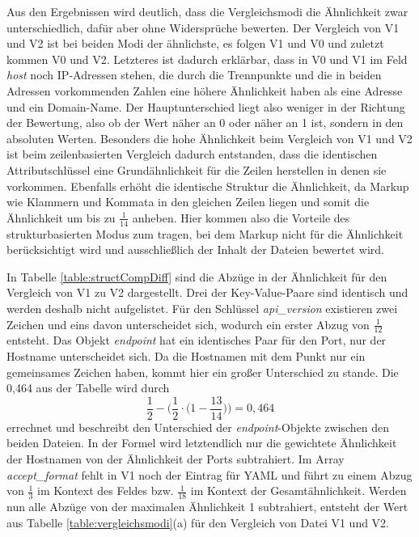 Aus den Ergebnissen wird deutlich, dass die Vergleichsmodi die Ähnlichkeit zwar unterschiedlich, dafür aber ohne Widersprüche bewerten. Der Vergleich von V1 und V2 ist bei beiden Modi der ähnlichste, es folgen V1 und V0 und zuletzt kommen V0 und V2. Letzteres ist dadurch erklärbar, dass in V0 und V1 im Feld \emph{host} noch IP-Adressen stehen, die durch die Trennpunkte und die in beiden Adressen vorkommenden Zahlen eine höhere Ähnlichkeit haben als eine Adresse und ein Domain-Name.
Der Hauptunterschied liegt also weniger in der Richtung der Bewertung, also ob der Wert näher an 0 oder näher an 1 ist, sondern in den absoluten Werten. Besonders die hohe Ähnlichkeit beim Vergleich von V1 und V2 ist beim zeilenbasierten Vergleich dadurch entstanden, dass die identischen Attributschlüssel eine Grundähnlichkeit für die Zeilen herstellen in denen sie vorkommen. Ebenfalls erhöht die identische Struktur die Ähnlichkeit, da Markup wie Klammern und Kommata in den gleichen Zeilen liegen und somit die Ähnlichkeit um bis zu $\frac{1}{14}$ anheben. Hier kommen also die Vorteile des strukturbasierten Modus zum tragen, bei dem Markup nicht für die Ähnlichkeit berücksichtigt wird und ausschließlich der Inhalt der Dateien bewertet wird. 

In Tabelle \ref{table:structCompDiff} sind die Abzüge in der Ähnlichkeit für den Vergleich von V1 zu V2 dargestellt. Drei der Key-Value-Paare sind identisch und werden deshalb nicht aufgelistet. Für den Schlüssel \emph{api\_version} existieren zwei Zeichen und eins davon unterscheidet sich, wodurch ein erster Abzug von $\frac{1}{12}$ entsteht. Das Objekt \emph{endpoint} hat ein identisches Paar für den Port, nur der Hostname unterscheidet sich. Da die Hostnamen mit dem Punkt nur ein gemeinsames Zeichen haben, kommt hier ein großer Unterschied zu stande. Die 0,464 aus der Tabelle wird durch \[ \frac{1}{2} - \Big(\frac{1}{2} \cdot \big(1 -  \frac{13}{14}\big) \Big) = 0,464 \] errechnet und beschreibt den Unterschied der \emph{endpoint}-Objekte zwischen den beiden Dateien. In der Formel wird letztendlich nur die gewichtete Ähnlichkeit der Hostnamen von der Ähnlichkeit der Ports subtrahiert. Im Array \emph{accept\_format} fehlt in V1 noch der Eintrag für YAML und führt zu einem Abzug von $\frac{1}{3}$ im Kontext des Feldes bzw. $\frac{1}{18}$ im Kontext der Gesamtähnlichkeit. Werden nun alle Abzüge von der maximalen Ähnlichkeit 1 subtrahiert, entsteht der Wert aus Tabelle \ref{table:vergleichsmodi}(a) für den Vergleich von Datei V1 und V2.

